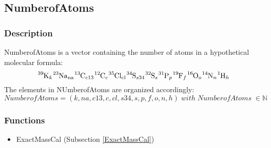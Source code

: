 \subsection{NumberofAtoms}\label{NumberofAtoms}
\subsubsection{Description}

NumberofAtoms is a vector containing the number of atoms in a hypothetical molecular formula:
\begin{equation}
\ce{^{39}K_{k}} \ce{^{23}Na_{na}} \ce{^{13}C_{c13}} \ce{^{12}C_{c}} \ce{^{35}Cl_{cl}} \ce{^{34}S_{s34}} \ce{^{32}S_{s}} \ce{^{31}P_{p}} \ce{^{19}F_{f}} \ce{^{16}O_{o}} \ce{^{14}N_{n}} \ce{^{1}H_{h}}
\end{equation} 
The elements in NUmberofAtoms are organized accordingly: 
\begin{equation}
NumberofAtoms=(k,na,c13,c,cl,s34,s,p,f,o,n,h) \; with \; NumberofAtoms \;\in \mathbb{N}
\end{equation}
\subsubsection{Functions}
\begin{itemize}
\item ExactMassCal (Subsection \ref{ExactMassCal})
\end{itemize}

